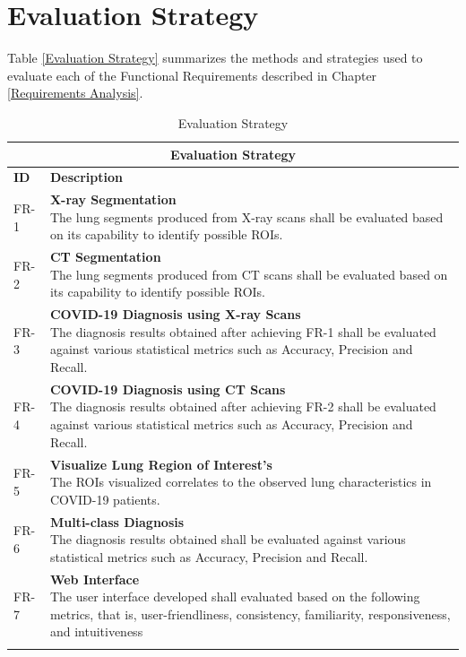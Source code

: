 \section{Evaluation Strategy}
Table \ref{Evaluation Strategy} summarizes the methods and strategies used to evaluate each of the Functional Requirements described in Chapter \ref{Requirements Analysis}.

\begin{longtable}{| p{} | p{} |} 
\hline
\multicolumn{2}{|c|}{\textbf{Evaluation Strategy}}\\
\hline
\textbf{ID} & \textbf{Description}\\
\hline
FR-1 & \parbox[t]{12.3cm}{\textbf{X-ray Segmentation} \\ The lung segments produced from X-ray scans shall be evaluated based on its capability to identify possible ROIs.}\\\hline
FR-2 & \parbox[t]{12.3cm}{\textbf{CT Segmentation} \\ The lung segments produced from CT scans shall be evaluated based on its capability to identify possible ROIs.}\\\hline
FR-3 & \parbox[t]{12.3cm}{\textbf{COVID-19 Diagnosis using X-ray Scans} \\ The diagnosis results obtained after achieving FR-1 shall be evaluated against various statistical metrics such as Accuracy, Precision and Recall.}\\\hline
FR-4 & \parbox[t]{12.3cm}{\textbf{COVID-19 Diagnosis using CT Scans} \\ The diagnosis results obtained after achieving FR-2 shall be evaluated against various statistical metrics such as Accuracy, Precision and Recall.}\\\hline
FR-5 & \parbox[t]{12.3cm}{\textbf{Visualize Lung Region of Interest's} \\ The ROIs visualized correlates to the observed lung characteristics in COVID-19 patients.} \\\hline
FR-6 & \parbox[t]{12.3cm}{\textbf{Multi-class Diagnosis} \\ The diagnosis results obtained shall be evaluated against various statistical metrics such as Accuracy, Precision and Recall.}\\\hline
FR-7 & \parbox[t]{12.3cm}{\textbf{Web Interface} \\ The user interface developed shall evaluated based on the following metrics, that is, user-friendliness, consistency, familiarity, responsiveness, and intuitiveness\vspace{0.2em}}\\\hline
\caption{Evaluation Strategy}

  \label{tab:Evaluation Strategy}
  \end{longtable}
  
